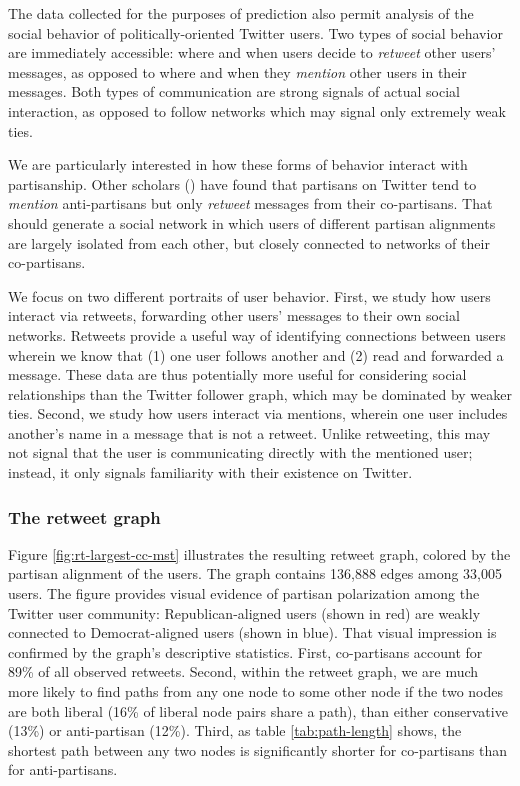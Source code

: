 \documentclass[11pt]{article}
\begin{document}
The data collected for the purposes of prediction also permit analysis
of the social behavior of politically-oriented Twitter users. Two
types of social behavior are immediately accessible: where and when
users decide to \textit{retweet} other users' messages, as opposed to
where and when they \textit{mention} other users in their
messages. Both types of communication are strong signals of actual
social interaction, as opposed to follow networks which may signal
only extremely weak ties.

We are particularly interested in how these forms of behavior interact
with partisanship. Other scholars () have found that partisans on
Twitter tend to \textit{mention} anti-partisans but only
\textit{retweet} messages from their co-partisans. That should
generate a social network in which users of different partisan
alignments are largely isolated from each other, but closely connected
to networks of their co-partisans. 

We focus on two different portraits of user behavior. First, we study
how users interact via retweets, forwarding other users' messages to
their own social networks. Retweets provide a useful way of
identifying connections between users wherein we know that (1) one user follows another and (2) read
and forwarded a message. These data are thus potentially more useful
for considering social relationships than the Twitter follower graph,
which may be dominated by weaker ties. Second, we study how users
interact via mentions, wherein one user includes another's name in a
message that is not a retweet. Unlike retweeting, this may not signal
that the user is communicating directly with the mentioned user;
instead, it only signals familiarity with their existence on Twitter. 

\subsubsection{The retweet graph}
\label{sec:retweet-graph}

Figure \ref{fig:rt-largest-cc-mst} illustrates the resulting retweet
graph, colored by the partisan alignment of the users. The graph
contains 136,888 edges among 33,005 users. The figure
provides visual evidence of partisan polarization among the Twitter
user community: Republican-aligned users (shown in red) are weakly
connected to Democrat-aligned users (shown in blue). That visual
impression is confirmed by the graph's descriptive statistics. First,
co-partisans account for 89\% of all observed retweets. Second, within
the retweet graph, we are much more likely to find paths from any one
node to some other node if the two nodes are both liberal (16\% of
liberal node pairs share a path), than either conservative (13\%) or
anti-partisan (12\%). Third, as table \ref{tab:path-length} shows, the shortest path between
any two nodes is significantly shorter for co-partisans than for anti-partisans. 
\end{document}
